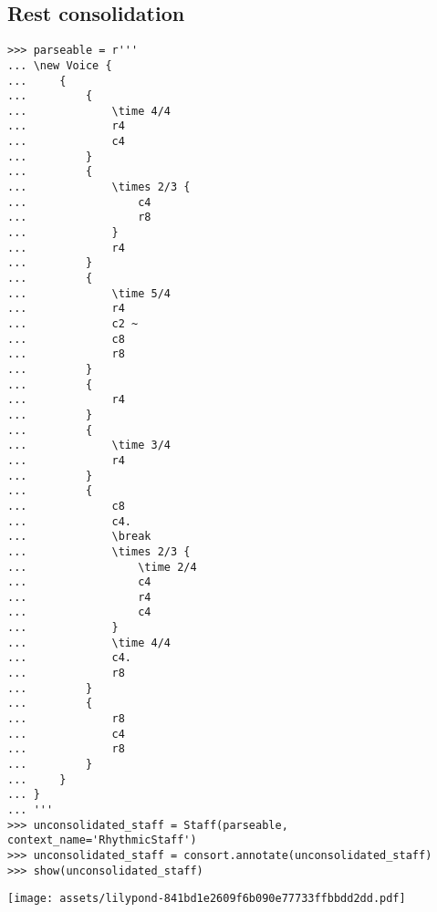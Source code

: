 \subsection{Rest consolidation}

\begin{comment}
<abjad>
parseable = r'''
\new Voice {
    {
        {
            \time 4/4
            r4
            c4
        }
        {
            \times 2/3 {
                c4
                r8
            }
            r4
        }
        {
            \time 5/4
            r4
            c2 ~
            c8
            r8
        }
        {
            r4
        }
        {
            \time 3/4
            r4
        }
        {
            c8
            c4.
            \break
            \times 2/3 {
                \time 2/4
                c4
                r4
                c4
            }
            \time 4/4
            c4.
            r8
        }
        {
            r8
            c4
            r8
        }
    }
}
'''
unconsolidated_staff = Staff(parseable, context_name='RhythmicStaff')
unconsolidated_staff = consort.annotate(unconsolidated_staff)
show(unconsolidated_staff)
</abjad>
\end{comment}

\begin{singlespacing}
\vspace{-0.5\baselineskip}
\begin{lstlisting}
>>> parseable = r'''
... \new Voice {
...     {
...         {
...             \time 4/4
...             r4
...             c4
...         }
...         {
...             \times 2/3 {
...                 c4
...                 r8
...             }
...             r4
...         }
...         {
...             \time 5/4
...             r4
...             c2 ~
...             c8
...             r8
...         }
...         {
...             r4
...         }
...         {
...             \time 3/4
...             r4
...         }
...         {
...             c8
...             c4.
...             \break
...             \times 2/3 {
...                 \time 2/4
...                 c4
...                 r4
...                 c4
...             }
...             \time 4/4
...             c4.
...             r8
...         }
...         {
...             r8
...             c4
...             r8
...         }
...     }
... }
... '''
>>> unconsolidated_staff = Staff(parseable, context_name='RhythmicStaff')
>>> unconsolidated_staff = consort.annotate(unconsolidated_staff)
>>> show(unconsolidated_staff)
\end{lstlisting}
\noindent\texttt{[image: assets/lilypond-841bd1e2609f6b090e77733ffbbdd2dd.pdf]}
\end{singlespacing}

